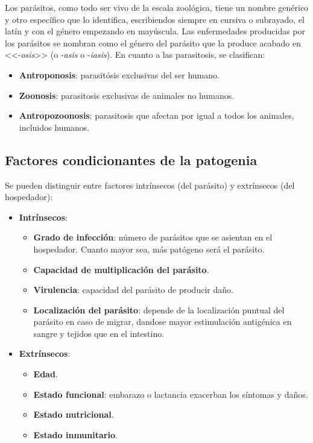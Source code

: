 \documentclass[10pt,a4paper,onecolumn,openany]{book}
\begin{document}
Los parásitos, como todo ser vivo de la escala zoológica, tiene un nombre genérico y otro específico que lo identifica, escribiendos siempre en cursiva o subrayado, el latín y con el género empezando en mayúscula. Las enfermedades producidas por los parásitos se nombran como el género del parásito que la produce acabado en <<-\textit{osis}>> (o -\textit{asis} o -\textit{iasis}). En cuanto a las parasitosis, se clasifican:
\begin{itemize}[itemsep=0pt,parsep=0pt,topsep=0pt,partopsep=0pt]
	\item \textbf{Antroponosis}: parasitósis exclusivas del ser humano.
	\item\textbf{Zoonosis}: parasitosis exclusivas de animales no humanos.
	\item\textbf{Antropozoonosis}: parasitosis que afectan por igual a todos los animales, incluidos humanos.
\end{itemize}
\subsection{Factores condicionantes de la patogenia}
Se pueden distinguir entre factores intrínsecos (del parásito) y extrínsecos (del hospedador):
\begin{itemize}[itemsep=0pt,parsep=0pt,topsep=0pt,partopsep=0pt]
	\item \textbf{Intrínsecos}:
	\begin{itemize}[itemsep=0pt,parsep=0pt,topsep=0pt,partopsep=0pt]
		\item \textbf{Grado de infección}: número de parásitos que se asientan en el hospedador. Cuanto mayor sea, más patógeno será el parásito.
		\item\textbf{Capacidad de multiplicación del parásito}.
		\item\textbf{Virulencia}: capacidad del parásito de producir daño.
		\item\textbf{Localización del parásito}: depende de la localización puntual del parásito en caso de migrar, dandose mayor estimulación antigénica en sangre y tejidos que en el intestino.
	\end{itemize}
	\item\textbf{Extrínsecos}:
	\begin{itemize}[itemsep=0pt,parsep=0pt,topsep=0pt,partopsep=0pt]
		\item \textbf{Edad}.
		\item\textbf{Estado funcional}: embarazo o lactancia exacerban los síntomas y daños.
		\item\textbf{Estado nutricional}.
		\item\textbf{Estado inmunitario}.
	\end{itemize}
\end{itemize}
\end{document}

